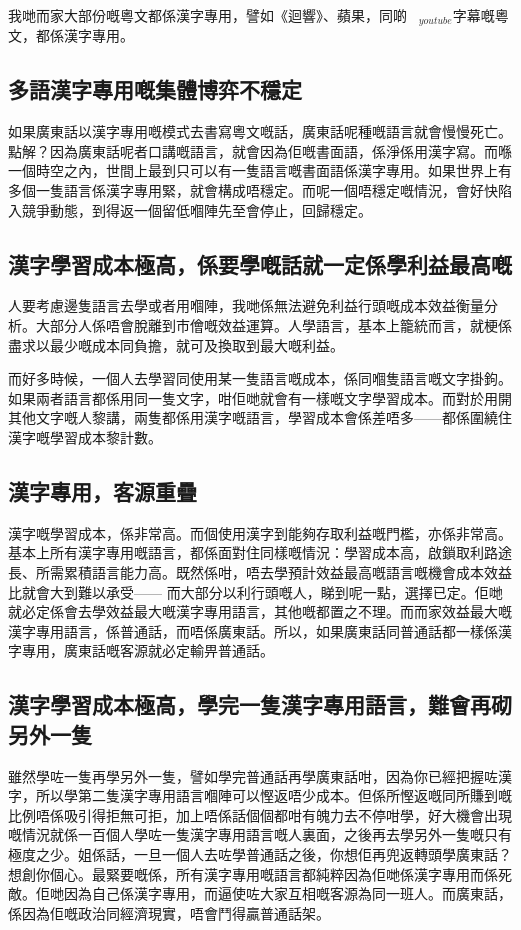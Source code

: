 我哋而家大部份嘅粵文都係漢字專用，譬如《迴響》、蘋果，同啲$_{youtube}$字幕嘅粵文，都係漢字專用。

\subsection*{多語漢字專用嘅集體博弈不穩定}
如果廣東話以漢字專用嘅模式去書寫粵文嘅話，廣東話呢種嘅語言就會慢慢死亡。點解？因為廣東話呢者口講嘅語言，就會因為佢嘅書面語，係淨係用漢字寫。而喺一個時空之內，世間上最到只可以有一隻語言嘅書面語係漢字專用。如果世界上有多個一隻語言係漢字專用緊，就會構成唔穩定。而呢一個唔穩定嘅情況，會好快陷入競爭動態，到得返一個留低嗰陣先至會停止，回歸穩定。

\subsection*{漢字學習成本極高，係要學嘅話就一定係學利益最高嘅}
人要考慮邊隻語言去學或者用嗰陣，我哋係無法避免利益行頭嘅成本效益衡量分析。大部分人係唔會脫離到市儈嘅效益運算。人學語言，基本上籠統而言，就梗係盡求以最少嘅成本同負擔，就可及換取到最大嘅利益。

而好多時候，一個人去學習同使用某一隻語言嘅成本，係同嗰隻語言嘅文字掛鉤。如果兩者語言都係用同一隻文字，咁佢哋就會有一樣嘅文字學習成本。而對於用開其他文字嘅人黎講，兩隻都係用漢字嘅語言，學習成本會係差唔多——都係圍繞住漢字嘅學習成本黎計數。

\subsection*{漢字專用，客源重疊}

漢字嘅學習成本，係非常高。而個使用漢字到能夠存取利益嘅門檻，亦係非常高。基本上所有漢字專用嘅語言，都係面對住同樣嘅情況：學習成本高，啟鎖取利路途長、所需累積語言能力高。既然係咁，唔去學預計效益最高嘅語言嘅機會成本效益比就會大到難以承受—— 而大部分以利行頭嘅人，睇到呢一點，選擇已定。佢哋就必定係會去學效益最大嘅漢字專用語言，其他嘅都置之不理。而而家效益最大嘅漢字專用語言，係普通話，而唔係廣東話。所以，如果廣東話同普通話都一樣係漢字專用，廣東話嘅客源就必定輸畀普通話。

\subsection*{漢字學習成本極高，學完一隻漢字專用語言，難會再砌另外一隻}
雖然學咗一隻再學另外一隻，譬如學完普通話再學廣東話咁，因為你已經把握咗漢字，所以學第二隻漢字專用語言嗰陣可以慳返唔少成本。但係所慳返嘅同所賺到嘅比例唔係吸引得拒無可拒，加上唔係話個個都咁有魄力去不停咁學，好大機會出現嘅情況就係一百個人學咗一隻漢字專用語言嘅人裏面，之後再去學另外一隻嘅只有極度之少。姐係話，一旦一個人去咗學普通話之後，你想佢再兜返轉頭學廣東話？想創你個心。最緊要嘅係，所有漢字專用嘅語言都純粹因為佢哋係漢字專用而係死敵。佢哋因為自己係漢字專用，而逼使咗大家互相嘅客源為同一班人。而廣東話，係因為佢嘅政治同經濟現實，唔會鬥得贏普通話架。

